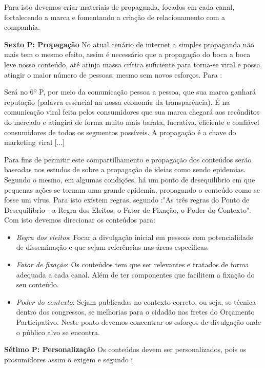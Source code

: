 Para isto devemos criar materiais de propaganda, focados em cada canal, fortalecendo a marca e fomentando a criação de relacionamento com a companhia.


\textbf{Sexto P: Propagação}
No atual cenário de internet a simples propaganda não mais tem o mesmo efeito, assim é necessário que a propagação do boca a boca leve nosso conteúdo, até atinja massa crítica suficiente para torna-se viral e possa atingir o maior número de pessoas, mesmo sem novos esforços. Para :

\begin{citacao}
Será no 6º P, por meio da comunicação pessoa a pessoa, que sua marca ganhará reputação (palavra essencial na nossa economia da transparência). É na comunicação viral feita pelos consumidores que sua marca chegará aos recônditos do mercado e atingirá de forma muito mais barata, lucrativa, eficiente e confiável consumidores de todos os segmentos possíveis. A propagação é a chave do marketing viral [...]
\end{citacao}

Para fins de permitir este compartilhamento e propagação dos conteúdos serão baseadas nos estudos de  sobre a propagação de ideias como sendo epidemias. Segundo o mesmo, em algumas condições, há um ponto de desequilíbrio em que pequenas ações se tornam uma grande epidemia, propagando o conteúdo como se fosse um vírus. Para isto existem regras, segundo :"As três regras do Ponto de Desequilíbrio - a Regra dos Eleitos, o Fator de Fixação, o Poder do Contexto".
Com isto devemos direcionar os conteúdos para:

\begin{itemize}
\item \emph{Regra dos eleitos}: Focar a divulgação inicial em pessoas com potencialidade de disseminação e que sejam referências nas áreas específicas.
\item \emph{Fator de fixação}: Os conteúdos tem que ser relevantes e tratados de forma adequada a cada canal. Além de ter componentes que facilitem a fixação do seu conteúdo.
\item \emph{Poder do contexto}: Sejam publicadas no contexto correto, ou seja, se técnica dentro dos congressos, se melhorias para o cidadão nas fretes do Orçamento Participativo. Neste ponto devemos concentrar os esforços de divulgação onde o público alvo se encontra.
\end{itemize}

\textbf{Sétimo P: Personalização}
Os conteúdos devem ser personalizados, pois os prosumidores \cite{Kotler2010} assim o exigem e segundo :

